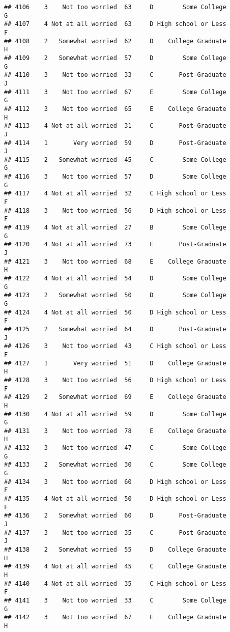 \documentclass[
]{article}
\begin{document}
\begin{verbatim}
## 4106    3    Not too worried  63     D        Some College         G
## 4107    4 Not at all worried  63     D High school or Less         F
## 4108    2   Somewhat worried  62     D    College Graduate         H
## 4109    2   Somewhat worried  57     D        Some College         G
## 4110    3    Not too worried  33     C       Post-Graduate         J
## 4111    3    Not too worried  67     E        Some College         G
## 4112    3    Not too worried  65     E    College Graduate         H
## 4113    4 Not at all worried  31     C       Post-Graduate         J
## 4114    1       Very worried  59     D       Post-Graduate         J
## 4115    2   Somewhat worried  45     C        Some College         G
## 4116    3    Not too worried  57     D        Some College         G
## 4117    4 Not at all worried  32     C High school or Less         F
## 4118    3    Not too worried  56     D High school or Less         F
## 4119    4 Not at all worried  27     B        Some College         G
## 4120    4 Not at all worried  73     E       Post-Graduate         J
## 4121    3    Not too worried  68     E    College Graduate         H
## 4122    4 Not at all worried  54     D        Some College         G
## 4123    2   Somewhat worried  50     D        Some College         G
## 4124    4 Not at all worried  50     D High school or Less         F
## 4125    2   Somewhat worried  64     D       Post-Graduate         J
## 4126    3    Not too worried  43     C High school or Less         F
## 4127    1       Very worried  51     D    College Graduate         H
## 4128    3    Not too worried  56     D High school or Less         F
## 4129    2   Somewhat worried  69     E    College Graduate         H
## 4130    4 Not at all worried  59     D        Some College         G
## 4131    3    Not too worried  78     E    College Graduate         H
## 4132    3    Not too worried  47     C        Some College         G
## 4133    2   Somewhat worried  30     C        Some College         G
## 4134    3    Not too worried  60     D High school or Less         F
## 4135    4 Not at all worried  50     D High school or Less         F
## 4136    2   Somewhat worried  60     D       Post-Graduate         J
## 4137    3    Not too worried  35     C       Post-Graduate         J
## 4138    2   Somewhat worried  55     D    College Graduate         H
## 4139    4 Not at all worried  45     C    College Graduate         H
## 4140    4 Not at all worried  35     C High school or Less         F
## 4141    3    Not too worried  33     C        Some College         G
## 4142    3    Not too worried  67     E    College Graduate         H

\end{verbatim}
\end{document}
